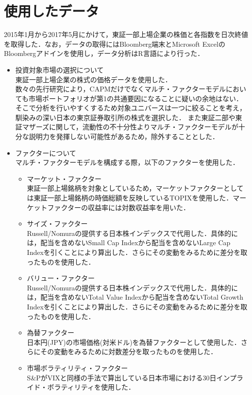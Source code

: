 ﻿\documentclass[11pt]{jreport}
\begin{document}
\section{使用したデータ}
2015年1月から2017年5月にかけて，東証一部上場企業の株価と各指数を日次終値を取得した．なお，データの取得にはBloomberg端末とMicrosoft ExcelのBloombergアドインを使用し，データ分析はR言語により行った．
\begin{itemize}
\item 投資対象市場の選択について\\
\quad 東証一部上場企業の株式の価格データを使用した．\\
\quad 数々の先行研究により，CAPMだけでなくマルチ・ファクターモデルにおいても市場ポートフォリオが第1の共通要因になることに疑いの余地はない．
そこで分析を行いやすくするため対象ユニバースは一つに絞ることを考え，馴染みの深い日本の東京証券取引所の株式を選択した．
また東証二部や東証マザーズに関して，流動性の不十分性よりマルチ・ファクターモデルが十分な説明力を発揮しない可能性があるため，除外することとした．
\item ファクターについて\\
マルチ・ファクターモデルを構成する際，以下のファクターを使用した．
\begin{itemize}
\item マーケット・ファクター\\
東証一部上場銘柄を対象としているため，マーケットファクターとしては東証一部上場銘柄の時価総額を反映しているTOPIXを使用した．マーケットファクターの収益率には対数収益率を用いた．
\item サイズ・ファクター\\
Russell/Nomuraの提供する日本株インデックスで代用した．具体的には，配当を含めないSmall Cap Indexから配当を含めないLarge Cap Indexを引くことにより算出した．さらにその変動をみるために差分を取ったものを使用した．
\item バリュー・ファクター\\
Russell/Nomuraの提供する日本株インデックスで代用した．具体的には，配当を含めないTotal Value Indexから配当を含めないTotal Growth Indexを引くことにより算出した．さらにその変動をみるために差分を取ったものを使用した．
\item 為替ファクター\\
日本円(JPY)の市場価格(対米ドル)を為替ファクターとして使用した．さらにその変動をみるために対数差分を取ったものを使用した．
\item 市場ボラティリティ・ファクター\\
S\&PがVIXと同様の手法で算出している日本市場における30日インプライド・ボラティリティを使用した．

\end{itemize}
\end{itemize}
\end{document}
